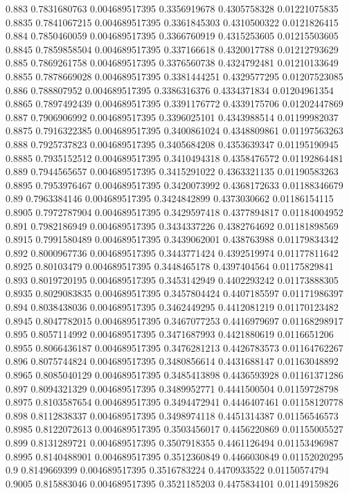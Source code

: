 {0.883 0.7831680763 0.004689517395 0.3356919678 0.4305758328 0.01221075835
0.8835 0.7841067215 0.004689517395 0.3361845303 0.4310500322 0.0121826415
0.884 0.7850460059 0.004689517395 0.3366760919 0.4315253605 0.01215503605
0.8845 0.7859858504 0.004689517395 0.337166618 0.4320017788 0.01212793629
0.885 0.7869261758 0.004689517395 0.3376560738 0.4324792481 0.01210133649
0.8855 0.7878669028 0.004689517395 0.3381444251 0.4329577295 0.01207523085
0.886 0.788807952 0.004689517395 0.3386316376 0.4334371834 0.01204961354
0.8865 0.7897492439 0.004689517395 0.3391176772 0.4339175706 0.01202447869
0.887 0.7906906992 0.004689517395 0.3396025101 0.4343988514 0.01199982037
0.8875 0.7916322385 0.004689517395 0.3400861024 0.4348809861 0.01197563263
0.888 0.7925737823 0.004689517395 0.3405684208 0.4353639347 0.01195190945
0.8885 0.7935152512 0.004689517395 0.3410494318 0.4358476572 0.01192864481
0.889 0.7944565657 0.004689517395 0.3415291022 0.4363321135 0.01190583263
0.8895 0.7953976467 0.004689517395 0.3420073992 0.4368172633 0.01188346679
0.89 0.7963384146 0.004689517395 0.3424842899 0.4373030662 0.01186154115
0.8905 0.7972787904 0.004689517395 0.3429597418 0.4377894817 0.01184004952
0.891 0.7982186949 0.004689517395 0.3434337226 0.4382764692 0.01181898569
0.8915 0.7991580489 0.004689517395 0.3439062001 0.438763988 0.01179834342
0.892 0.8000967736 0.004689517395 0.3443771424 0.4392519974 0.01177811642
0.8925 0.80103479 0.004689517395 0.3448465178 0.4397404564 0.01175829841
0.893 0.8019720195 0.004689517395 0.3453142949 0.4402293242 0.01173888305
0.8935 0.8029083835 0.004689517395 0.3457804424 0.4407185597 0.01171986397
0.894 0.8038438036 0.004689517395 0.3462449295 0.4412081219 0.01170123482
0.8945 0.8047782015 0.004689517395 0.3467077253 0.4416979697 0.01168298917
0.895 0.8057114992 0.004689517395 0.3471687993 0.4421880619 0.0116651206
0.8955 0.8066436187 0.004689517395 0.3476281213 0.4426783573 0.01164762267
0.896 0.8075744824 0.004689517395 0.3480856614 0.4431688147 0.01163048892
0.8965 0.8085040129 0.004689517395 0.3485413898 0.4436593928 0.01161371286
0.897 0.8094321329 0.004689517395 0.3489952771 0.4441500504 0.01159728798
0.8975 0.8103587654 0.004689517395 0.3494472941 0.4446407461 0.01158120778
0.898 0.8112838337 0.004689517395 0.3498974118 0.4451314387 0.01156546573
0.8985 0.8122072613 0.004689517395 0.3503456017 0.4456220869 0.01155005527
0.899 0.8131289721 0.004689517395 0.3507918355 0.4461126494 0.01153496987
0.8995 0.8140488901 0.004689517395 0.3512360849 0.4466030849 0.01152020295
0.9 0.8149669399 0.004689517395 0.3516783224 0.4470933522 0.01150574794
0.9005 0.815883046 0.004689517395 0.3521185203 0.4475834101 0.01149159826
}
